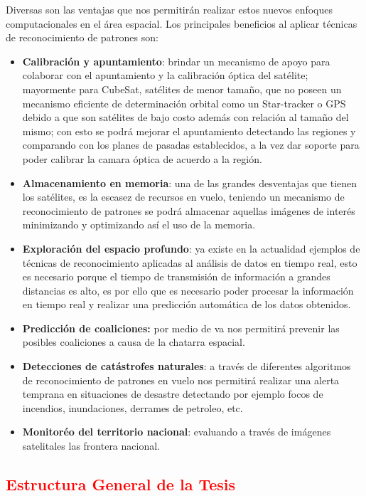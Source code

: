 Diversas son las ventajas que nos permitirán realizar estos nuevos enfoques computacionales en el área espacial. Los principales beneficios al aplicar técnicas de reconocimiento de patrones son: 
\begin{itemize}
\item \textbf{Calibración y apuntamiento}: brindar un mecanismo de apoyo para colaborar con el apuntamiento y la calibración óptica del satélite; mayormente para CubeSat, satélites de menor tamaño, que no poseen un mecanismo eficiente de determinación orbital como un Star-tracker o GPS debido a que son satélites de bajo costo además con relación al tamaño del mismo; con esto se podrá mejorar el apuntamiento detectando las regiones y comparando con los planes de pasadas  establecidos, a la vez dar soporte para poder calibrar la camara óptica de acuerdo a la región.
\item \textbf{Almacenamiento en memoria}: una de las grandes desventajas que tienen los satélites, es la escasez de recursos en vuelo, teniendo un mecanismo de reconocimiento de patrones se podrá almacenar aquellas imágenes de interés minimizando y optimizando  así el uso de la memoria.
\item \textbf{Exploración del espacio profundo}: ya existe en la actualidad ejemplos de técnicas de reconocimiento aplicadas al análisis de datos en tiempo real, esto es necesario  porque el tiempo de transmisión de información a grandes distancias es alto, es por ello que es necesario poder procesar la información en tiempo real y realizar una predicción automática de los datos obtenidos.
\item \textbf{Predicción de coaliciones:} por medio de \ac{va} nos permitirá prevenir las posibles coaliciones a causa de la chatarra espacial. 
\item \textbf{Detecciones de catástrofes naturales}: a través de diferentes algoritmos de reconocimiento de patrones en vuelo nos permitirá realizar una alerta temprana en situaciones de desastre detectando por ejemplo focos de incendios, inundaciones, derrames de petroleo, etc.
\item \textbf{Monitoréo del territorio nacional}: evaluando a través de imágenes satelitales las frontera nacional.
\end{itemize}


\textcolor{red}{
\section{Estructura General de la Tesis }\label{sec:estructura}}

